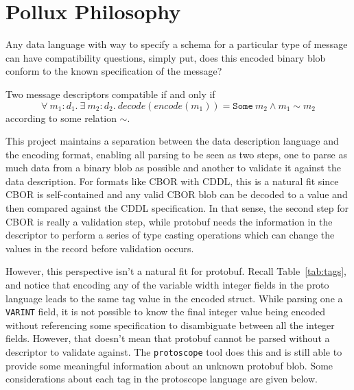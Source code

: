 \section{Pollux Philosophy}

Any data language with way to specify a schema for a particular type of message
can have compatibility questions, simply put, does this encoded binary blob
conform to the known specification of the message?

\begin{definition}[Compatibility]\label{def:compat}
  Two message descriptors compatible if and only if
  \[ \forall\ m_1:d_1.\ \exists\ m_2:d_2.\ decode(encode(m_1)) = \mathtt{Some}\ m_2 \wedge m_1 \sim m_2 \]
  according to some relation $\sim$. 
\end{definition}

This project maintains a separation between the data description language and
the encoding format, enabling all parsing to be seen as two steps, one to parse
as much data from a binary blob as possible and another to validate it against
the data description. For formats like CBOR with CDDL, this is a natural fit
since CBOR is self-contained and any valid CBOR blob can be decoded to a value
and then compared against the CDDL specification. In that sense, the second step
for CBOR is really a validation step, while protobuf needs the information in
the descriptor to perform a series of type casting operations which can change
the values in the record before validation occurs.

However, this perspective isn't a natural fit for protobuf. Recall
Table~\ref{tab:tags}, and notice that encoding any of the variable width integer
fields in the proto language leads to the same tag value in the encoded
struct. While parsing one a \texttt{VARINT} field, it is not possible to know
the final integer value being encoded without referencing some specification to
disambiguate between all the integer fields. However, that doesn't mean that
protobuf cannot be parsed without a descriptor to validate against. The
\texttt{protoscope} tool does this and is still able to provide some meaningful
information about an unknown protobuf blob. Some considerations about each tag
in the protoscope language are given below.

